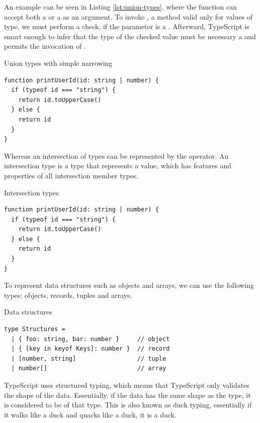 An example can be seen in Listing \ref{lst:union-types}, where the function  can accept both a  or a  as an argument. To invoke , a method valid only for values of  type, we must perform a check, if the parameter is a . Afterward, TypeScript is smart enough to infer that the type of the checked value must be necessary a  and permits the invocation of .

\begin{listing}[h]
  \caption{Union types with simple narrowing}\label{lst:union-types}
  \begin{verbatim}
function printUserId(id: string | number) {
  if (typeof id === "string") {
    return id.toUpperCase()
  } else {
    return id
  }
}
  \end{verbatim}
\end{listing}

Whereas an intersection of types can be represented by the \code{&} operator. An intersection type is a type that represents a value, which has features and properties of all intersection member types.

\begin{listing}[h]
  \caption{Intersection types}\label{lst:union-types}
  \begin{verbatim}
function printUserId(id: string | number) {
  if (typeof id === "string") {
    return id.toUpperCase()
  } else {
    return id
  }
}
  \end{verbatim}
\end{listing}

To represent data structures such as objects and arrays, we can use the following types: objects, records, tuples and arrays.

\begin{listing}[h]
  \caption{Data structures}
  \begin{verbatim}
type Structures = 
  | { foo: string, bar: number }     // object
  | { [key in keyof Keys]: number }  // record
  | [number, string]                 // tuple
  | number[]                         // array
\end{verbatim}
\end{listing}

TypeScript uses structured typing, which means that TypeScript only validates the shape of the data. Essentially, if the data has the same shape as the type, it is considered to be of that type. This is also known as duck typing, essentially if it walks like a duck and quacks like a duck, it is a duck.

